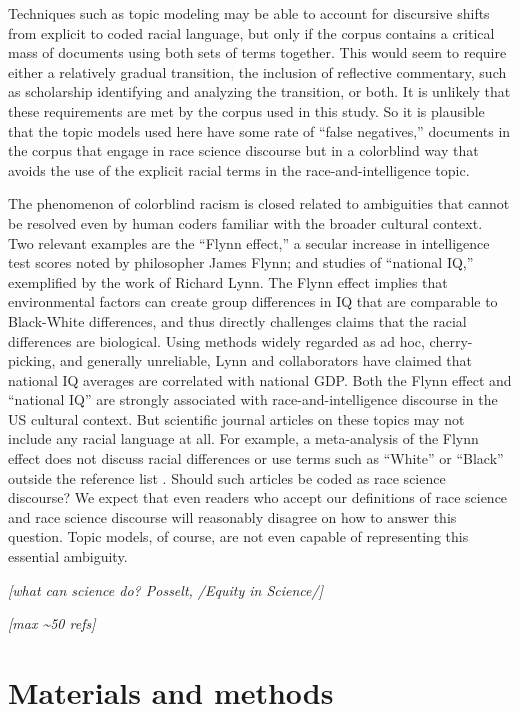 \documentclass[12pt]{article}
\begin{document}
Techniques such as topic modeling may be able to account for discursive shifts from explicit to coded racial language, but only if the corpus contains a critical mass of documents using both sets of terms together. This would seem to require either a relatively gradual transition, the inclusion of reflective commentary, such as scholarship identifying and analyzing the transition, or both. It is unlikely that these requirements are met by the corpus used in this study. So it is plausible that the topic models used here have some rate of ``false negatives,'' documents in the corpus that engage in race science discourse but in a colorblind way that avoids the use of the explicit racial terms in the race-and-intelligence topic.

The phenomenon of colorblind racism is closed related to ambiguities that cannot be resolved even by human coders familiar with the broader cultural context. Two relevant examples are the ``Flynn effect,'' a secular increase in intelligence test scores noted by philosopher James Flynn; and studies of ``national IQ,'' exemplified by the work of Richard Lynn. The Flynn effect implies that environmental factors can create group differences in IQ that are comparable to Black-White differences, and thus directly challenges claims that the racial differences are biological. Using methods widely regarded as ad hoc, cherry-picking, and generally unreliable, Lynn and collaborators have claimed that national IQ averages are correlated with national GDP. Both the Flynn effect and ``national IQ'' are strongly associated with race-and-intelligence discourse in the US cultural context. But scientific journal articles on these topics may not include any racial language at all. For example, a meta-analysis of the Flynn effect does not discuss racial differences or use terms such as ``White'' or ``Black'' outside the reference list \cite{TrahanFlynnEffectMetaanalysis2014}. Should such articles be coded as race science discourse? We expect that even readers who accept our definitions of race science and race science discourse will reasonably disagree on how to answer this question. Topic models, of course, are not even capable of representing this essential ambiguity.

\emph{{[}what can science do? Posselt, /Equity in Science/{]}}

\emph{{[}max \textasciitilde50 refs{]}}

\appendix

\hypertarget{materials-and-methods}{%
\section*{Materials and methods}\label{materials-and-methods}}
\end{document}
